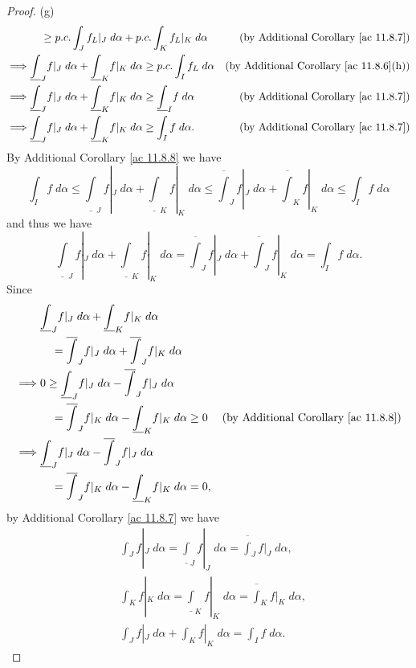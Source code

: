 \begin{proof}{(g)}
\begin{align*}
                 & \quad \geq p.c. \int_J f_L|_J \; d \alpha + p.c. \int_K f_L|_K \; d \alpha                                      & \text{(by Additional Corollary \ref{ac 11.8.7})}    \\
        \implies & \underline{\int}_J f|_J \; d \alpha + \underline{\int}_K f|_K \; d \alpha \geq p.c. \int_I f_L \; d \alpha      & \text{(by Additional Corollary \ref{ac 11.8.6}(h))} \\
        \implies & \underline{\int}_J f|_J \; d \alpha + \underline{\int}_K f|_K \; d \alpha \geq \underline{\int}_I f \; d \alpha & \text{(by Additional Corollary \ref{ac 11.8.7})}    \\
        \implies & \underline{\int}_J f|_J \; d \alpha + \underline{\int}_K f|_K \; d \alpha \geq \int_I f \; d \alpha.            & \text{(by Additional Corollary \ref{ac 11.8.7})}
    \end{align*}
    By Additional Corollary \ref{ac 11.8.8} we have
    \[
        \int_I f \; d \alpha \leq \underline{\int}_J f|_J \; d \alpha + \underline{\int}_K f|_K \; d \alpha \leq \overline{\int}_J f|_J \; d \alpha + \overline{\int}_K f|_K \; d \alpha \leq \int_I f \; d \alpha
    \]
    and thus we have
    \[
        \underline{\int}_J f|_J \; d \alpha + \underline{\int}_K f|_K \; d \alpha = \overline{\int}_J f|_J \; d \alpha + \overline{\int}_J f|_K \; d \alpha = \int_I f \; d \alpha.
    \]
    Since
    \begin{align*}
                 & \underline{\int}_J f|_J \; d \alpha + \underline{\int}_K f|_K \; d \alpha                                                                  \\
                 & \quad = \overline{\int}_J f|_J \; d \alpha + \overline{\int}_J f|_K \; d \alpha                                                            \\
        \implies & 0 \geq \underline{\int}_J f|_J \; d \alpha - \overline{\int}_J f|_J \; d \alpha                                                            \\
                 & \quad = \overline{\int}_J f|_K \; d \alpha - \underline{\int}_K f|_K \; d \alpha \geq 0 & \text{(by Additional Corollary \ref{ac 11.8.8})} \\
        \implies & \underline{\int}_J f|_J \; d \alpha - \overline{\int}_J f|_J \; d \alpha                                                                   \\
                 & \quad = \overline{\int}_J f|_K \; d \alpha - \underline{\int}_K f|_K \; d \alpha = 0,
    \end{align*}
    by Additional Corollary \ref{ac 11.8.7} we have
    \begin{align*}
         & \int_J f|_J \; d \alpha = \underline{\int}_J f|_J \; d \alpha = \overline{\int}_J f|_J \; d \alpha, \\
         & \int_K f|_K \; d \alpha = \underline{\int}_K f|_K \; d \alpha = \overline{\int}_K f|_K \; d \alpha, \\
         & \int_J f|_J \; d \alpha + \int_K f|_K \; d \alpha = \int_I f \; d \alpha.
    \end{align*}
\end{proof}

